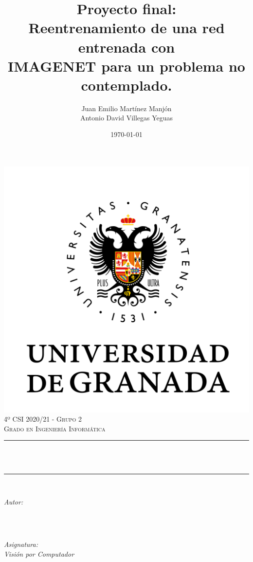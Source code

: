 \documentclass[12pt, spanish]{article}
\title{Proyecto final:\\
Reentrenamiento de una red entrenada con\\
IMAGENET para un problema no contemplado.\hspace{0.05cm} }
\author{Juan Emilio Martínez Manjón\\
        Antonio David Villegas Yeguas}
\date{\today}
\makeatletter
\let\thetitle\@title
\let\theauthor\@author
\let\thedate\@date
\makeatother
\begin{document}

\begin{titlepage}
    \centering
    \vspace*{0.3 cm}
    \includegraphics[scale = 0.50]{ugr.png}\\[0.7 cm]
    \textsc{\large 4º CSI 2020/21 - Grupo 2}\\[0.5 cm]
    \textsc{\large Grado en Ingeniería Informática}\\[0.5 cm]
    \rule{\linewidth}{0.2 mm} \\[0.2 cm]
    { \huge \bfseries \thetitle}\\
    \rule{\linewidth}{0.2 mm} \\[1 cm]

    \begin{minipage}{0.4\textwidth}
        \begin{flushleft} \large
            \emph{Autor:}\\
            \theauthor\\
            \end{flushleft}
            \end{minipage}~
            \begin{minipage}{0.4\textwidth}
            \begin{flushright} \large
            \emph{Asignatura: \\
            Visión por Computador}   \\
        \end{flushright}
    \end{minipage}\\[0.5cm]

    {\large \thedate}\\[0.5cm]
    {\doclicenseThis}

    \vfill

\end{titlepage}
\end{document}
